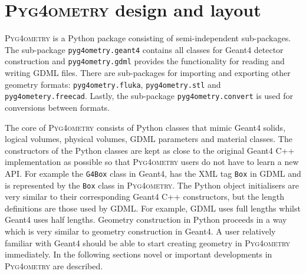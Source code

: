 \documentclass[final,5p,times,twocolumn]{elsarticle}
\newcommand{\pyinline}[1]{\lstinline[postbreak={}]{#1}}
\newcommand{\PYGEOMETRY}{\textsc{Pyg4ometry}}
\begin{document}
\section{\PYGEOMETRY{} design and layout}
\PYGEOMETRY{} is a Python package consisting of semi-independent sub-packages. The sub-package \verb|pyg4ometry.geant4| contains all classes for 
Geant4 detector construction and \verb|pyg4ometry.gdml| provides the functionality for reading and writing GDML files. There are sub-packages for importing and 
exporting other geometry formats: \verb|pyg4ometry.fluka|, \verb|pyg4ometry.stl| and \verb|pyg4ometery.freecad|.  Lastly, the sub-package \verb|pyg4ometry.convert| 
is used for conversions between formats.

The core of \PYGEOMETRY{} consists of Python classes that mimic Geant4 solids, logical volumes, physical volumes, GDML parameters and material classes.
The constructors of the Python classes are kept as close to the original Geant4 C++ implementation as possible so that \PYGEOMETRY{} users do not have to learn 
a new API. For example the \verb|G4Box| class in Geant4, has the XML tag \verb|Box| in GDML and is represented by the \pyinline{Box} 
class in \PYGEOMETRY{}. The Python object initialisers are very similar to their corresponding Geant4 C++ constructors, but the length definitions are those used by GDML. For example, 
GDML uses full lengths whilst Geant4 uses half lengths. Geometry construction in Python proceeds in a way which is very similar to geometry construction in Geant4. 
A user relatively familiar with Geant4 should be able to start creating geometry in \PYGEOMETRY{} immediately. In the following sections novel or important developments 
in \PYGEOMETRY{} are described.  
\end{document}
